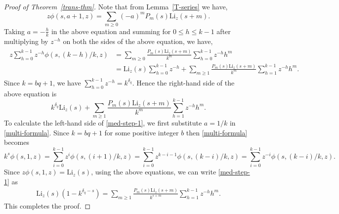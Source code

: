 \documentclass[12pt]{amsart}
\newcommand{\thmref}[1]{Theorem~\ref{#1}}
\newcommand{\lemref}[1]{Lemma~\ref{#1}}
\begin{document}
\begin{proof}[Proof of \thmref{trans-thm}] Note that from \lemref{T-series} we have,
\begin{equation}\label{power-series}
z\phi(s,a+1,z)=\sum_{m\ge 0}(-a)^mP_m(s)\mathrm{Li}_z(s+m).
\end{equation}
Taking $a=-\frac{h}{k}$ in the above equation and summing for $0\leq h\leq k-1$ after multiplying by $z^{-h}$ on
both the sides of the above equation, we have,
\begin{align}\label{med-step-1}
\begin{split}
z\sum_{h=0}^{k-1}z^{-h}\phi\left(s,(k-h)/k,z\right)&=\sum_{m\ge 0}\frac{P_m(s)\mathrm{Li}_z(s+m)}{k^m}\sum_{h=0}^{k-1}z^{-h}h^m\\
&=\mathrm{Li}_z(s)\sum_{h=0}^{k-1}z^{-h}+\sum_{m\ge 1}\frac{P_m(s)\mathrm{Li}_z(s+m)}{k^m}\sum_{h=1}^{k-1}z^{-h}h^m.
\end{split}
\end{align}
Since $k=bq+1$, we have $\sum_{h=0}^{k-1}z^{-h}=k^{\delta_{q}}$. Hence the right-hand side of the above equation is
$$
k^{\delta_{q}}\mathrm{Li}_z(s)+\sum_{m\ge 1}\frac{P_m(s)\mathrm{Li}_z(s+m)}{k^m}\sum_{h=1}^{k-1}z^{-h}h^m.
$$
To calculate the left-hand side of \eqref{med-step-1}, we first substitute $a=1/k$ in \eqref{multi-formula}. Since $k=bq+1$
for some positive integer $b$ then \eqref{multi-formula} becomes
$$
k^s\phi(s,1,z)=\sum_{i=0}^{k-1}z^i\phi(s,(i+1)/k,z)=\sum_{i=0}^{k-1}z^{k-i-1}\phi(s,(k-i)/k,z)=\sum_{i=0}^{k-1}z^{-i}\phi(s,(k-i)/k,z).
$$
Since $z\phi(s,1,z)=\mathrm{Li}_z(s)$, using the above equations, we can write \eqref{med-step-1} as
\begin{align*}
\mathrm{Li}_{z}(s)(1-k^{\delta_{q}-s})=\sum_{m\ge 1}\frac{P_m(s)\mathrm{Li}_z(s+m)}{k^{s+m}}\sum_{h=1}^{k-1}z^{-h}h^m.
\end{align*}
This completes the proof.
\end{proof}
\end{document}
